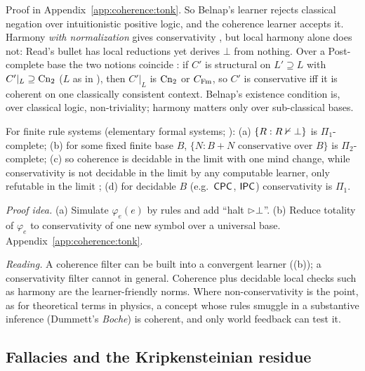 Proof in Appendix~\ref{app:coherence:tonk}. So Belnap's learner rejects classical negation over intuitionistic positive logic, and the coherence learner accepts it. Harmony \emph{with normalization} gives conservativity \citep{prawitz1965natural,dummett1991logical}, but local harmony alone does not: Read's bullet \citep{read2000harmony} has local reductions yet derives $\bot$ from nothing. Over a Post-complete base the two notions coincide : if $C'$ is structural on $L'\supseteq L$ with $C'|_L\supseteq\mathrm{Cn}_2$ ($L$ as in ), then $C'|_L$ is $\mathrm{Cn}_2$ or $C_{\mathrm{Fm}}$, so $C'$ is conservative iff it is coherent on one classically consistent context. Belnap's existence condition is, over classical logic, non-triviality; harmony matters only over sub-classical bases.

\begin{theorem}\label{thm:coherence:complexity}
For finite rule systems (elementary formal systems; \citealt{post1943formal,smullyan1961theory}): \textup{(a)} $\{R:R\nvdash\bot\}$ is $\Pi_1$-complete; \textup{(b)} for some fixed finite base $B$, $\{N:B+N\text{ conservative over }B\}$ is $\Pi_2$-complete; \textup{(c)} so coherence is decidable in the limit with one mind change, while conservativity is not decidable in the limit by any computable learner, only refutable in the limit \citep{kelly1996logic}; \textup{(d)} for decidable $B$ (e.g.\ $\mathsf{CPC}$, $\mathsf{IPC}$) conservativity is $\Pi_1$.
\end{theorem}

\noindent\emph{Proof idea.} (a) Simulate $\varphi_e(e)$ by rules and add ``halt $\rhd\bot$''. (b) Reduce totality of $\varphi_e$ to conservativity of one new symbol over a universal base. Appendix~\ref{app:coherence:tonk}.

\emph{Reading.} A coherence filter can be built into a convergent learner ((b)); a conservativity filter cannot in general. Coherence plus decidable local checks such as harmony are the learner-friendly norms. Where non-conservativity is the point, as for theoretical terms in physics, a concept whose rules smuggle in a substantive inference (Dummett's \emph{Boche}) is coherent, and only world feedback can test it.

\subsection{Fallacies and the Kripkensteinian residue}\label{sec:coherence:fallacies}

